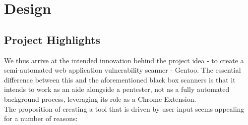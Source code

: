 \chapter{Design}


\section{Project Highlights}
\label{contribution}

We thus arrive at the intended innovation behind the project idea - to create a semi-automated web application vulnerability scanner - Gentoo. The essential difference between this and the aforementioned black box scanners is that it intends to work as an aide alongside a pentester, not as a fully automated background process, leveraging its role as a Chrome Extension. \\

The proposition of creating a tool that is driven by user input seems appealing for a number of reasons:

